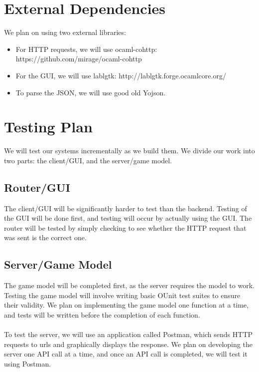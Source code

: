 \documentclass{article}
\begin{document}
    \section{External Dependencies}
    We plan on using two external libraries:
    \begin{itemize}
   	 \item For HTTP requests, we will use ocaml-cohttp: https://github.com/mirage/ocaml-cohttp
    	\item For the GUI, we will use lablgtk: http://lablgtk.forge.ocamlcore.org/
	\item To parse the JSON, we will use good old Yojson.
    \end{itemize}

    \section{Testing Plan}
    We will test our systems incrementally as we build them. We divide our work into two parts: the client/GUI, and the server/game model.

    \subsection{Router/GUI}
    The client/GUI will be significantly harder to test than the backend. Testing of the GUI will be done first, and testing will occur by actually using the GUI. The router will be tested by simply checking to see whether the HTTP request that was sent is the correct one.

    \subsection{Server/Game Model}
    The game model will be completed first, as the server requires the model to work. Testing the game model will involve writing basic OUnit test suites to ensure their validity. We plan on implementing the game model one function at a time, and tests will be written before the completion of each function. \\
    \\
    To test the server, we will use an application called Postman, which sends HTTP requests to urls and graphically displays the response. We plan on developing the server one API call at a time, and once an API call is completed, we will test it using Postman.
\end{document}
